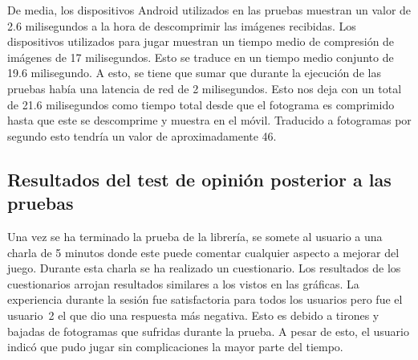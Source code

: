 De media, los dispositivos Android utilizados en las pruebas muestran un valor de 2.6 milisegundos a la hora de descomprimir las im\'agenes recibidas. Los dispositivos utilizados para jugar muestran un tiempo medio de compresi\'on de im\'agenes de 17 milisegundos. Esto se traduce en un tiempo medio conjunto de 19.6 milisegundo. A esto, se tiene que sumar que durante la ejecuci\'on de las pruebas hab\'ia una latencia de red de 2 milisegundos. Esto nos deja con un total de 21.6 milisegundos como tiempo total desde que el fotograma es comprimido hasta que este se descomprime y muestra en el m\'ovil. Traducido a fotogramas por segundo esto tendr\'ia un valor de aproximadamente 46.

\subsection{Resultados del test de opini\'on posterior a las pruebas}

Una vez se ha terminado la prueba de la librer\'ia, se somete al usuario a una charla de 5 minutos donde este puede comentar cualquier aspecto a mejorar del juego. Durante esta charla se ha realizado un cuestionario. Los resultados de los cuestionarios arrojan resultados similares a los vistos en las gr\'aficas. La experiencia durante la sesi\'on fue satisfactoria para todos los usuarios pero fue el usuario~2 el que dio una respuesta m\'as negativa. Esto es debido a tirones y bajadas de fotogramas que sufridas durante la prueba. A pesar de esto, el usuario indic\'o que pudo jugar sin complicaciones la mayor parte del tiempo.

\begin{table}[h]
\caption{Resultados del test realizado a los usuarios posterior a la prueba}
\label{opinionesusuarios}
\end{table}


